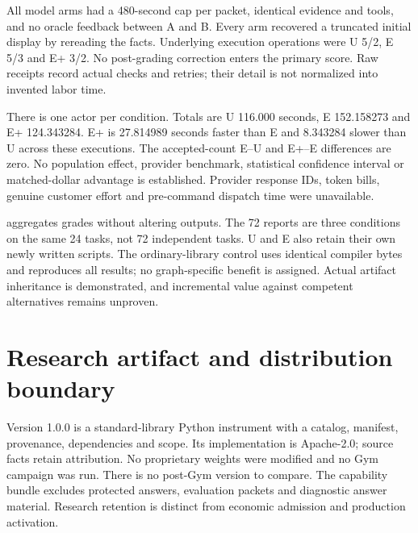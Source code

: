 \documentclass[10pt]{article}
\begin{document}
All model arms had a 480-second cap per packet, identical evidence and tools, and no oracle feedback between A and B. Every arm recovered a truncated initial display by rereading the facts. Underlying execution operations were U 5/2, E 5/3 and E+ 3/2. No post-grading correction enters the primary score. Raw receipts record actual checks and retries; their detail is not normalized into invented labor time.

There is one actor per condition. Totals are U 116.000 seconds, E 152.158273 and E+ 124.343284. E+ is 27.814989 seconds faster than E and 8.343284 slower than U across these executions. The accepted-count E--U and E+--E differences are zero. No population effect, provider benchmark, statistical confidence interval or matched-dollar advantage is established. Provider response IDs, token bills, genuine customer effort and pre-command dispatch time were unavailable.

 aggregates grades without altering outputs. The 72 reports are three conditions on the same 24 tasks, not 72 independent tasks. U and E also retain their own newly written scripts. The ordinary-library control uses identical compiler bytes and reproduces all results; no graph-specific benefit is assigned. Actual artifact inheritance is demonstrated, and incremental value against competent alternatives remains unproven.

\section{Research artifact and distribution boundary}
Version 1.0.0 is a standard-library Python instrument with a catalog, manifest, provenance, dependencies and scope. Its implementation is Apache-2.0; source facts retain attribution. No proprietary weights were modified and no Gym campaign was run. There is no post-Gym version to compare. The capability bundle excludes protected answers, evaluation packets and diagnostic answer material. Research retention is distinct from economic admission and production activation.
\end{document}

